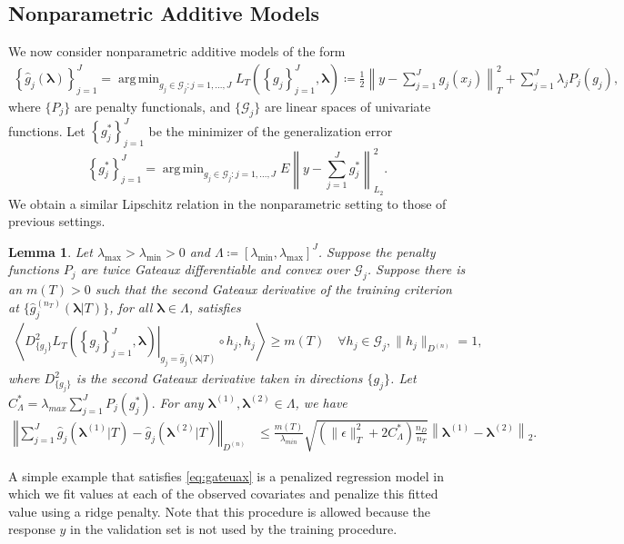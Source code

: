 \documentclass[12pt]{article} %
\newtheorem{lemma}{Lemma}
\theoremstyle{definition}
\DeclareMathOperator*{\argmin}{arg\,min}
\begin{document}
\subsection{Nonparametric Additive Models}
\label{sec:nonparam_smooth}

We now consider nonparametric additive models of the form
\begin{align}
\label{eq:train_crit_nonparam}
\left\{ \hat{g}_j( \boldsymbol \lambda) \right \}_{j=1}^J
=
\argmin_{g_j\in \mathcal{G}_j: j=1,...,J}  L_T\left (\left \{ g_j \right \}_{j=1}^J, \boldsymbol{\lambda} \right )
\coloneqq
\frac{1}{2} \left \| y -  \sum_{j=1}^J g_j(x_j) \right \|^2_T
+ \sum_{j=1}^J \lambda_j P_j(g_j),
\end{align}
where $\{P_j\}$ are penalty functionals, and $\{\mathcal{G}_j\}$ are linear spaces of univariate functions.
Let $\left\{ g_j^* \right \}_{j=1}^J$ be the minimizer of the generalization error
\begin{equation}
\left\{ g_j^* \right \}_{j=1}^J = \argmin_{g_j \in \mathcal{G}_j: j=1,...,J}
E \left \| y - \sum_{j=1}^J g_j^* \right \|^2_{L_2}.
\end{equation}
We obtain a similar Lipschitz relation in the nonparametric setting to those of previous settings.
\begin{lemma}
	\label{lemma:nonparam_smooth}
	Let $\lambda_{\max} > \lambda_{\min} > 0 $ and $\Lambda \coloneqq [\lambda_{\min}, \lambda_{\max}]^J$.
	Suppose the penalty functions $P_{j}$ are twice Gateaux differentiable and convex over $\mathcal{G}_j$.
	Suppose there is an $m(T) > 0$ such that the second Gateaux derivative of the training criterion at $\{\hat{g}^{(n_T)}_j( \boldsymbol{\lambda} | T)\}$, for all $\boldsymbol{\lambda} \in \Lambda$, satisfies
	\begin{align}
	\left \langle
	\left . D^2_{\{g_j\}} L_T \left ( \left \{ g_j \right \}_{j=1}^J, \boldsymbol{\lambda} \right ) \right |_{g_j= \hat{g}_j( \boldsymbol{\lambda} | T) }
	\circ h_j, h_j
	\right \rangle
	\ge m(T)
	\quad \forall h_j \in \mathcal{G}_j,  \|h_j \|_{D^{(n)}} = 1,
	\label{eq:gateuax}
	\end{align}
	where $D^2_{\{g_j\}}$ is the second Gateaux derivative taken in directions $\{g_j\}$.
	Let $
	C_{\Lambda}^*= \lambda_{max}\sum_{j=1}^{J} P_{j}(g^*_j).
	$
	For any $\boldsymbol{\lambda}^{(1)}, \boldsymbol{\lambda}^{(2)} \in \Lambda$, we have
	\begin{align}
	\label{eq:nonparam_lipshitz_thrm}
	\left\Vert
	\sum_{j=1}^J \hat{g}_j\left(\boldsymbol{\lambda}^{(1)} |T \right)-\hat{g}_j\left(\boldsymbol{\lambda}^{(2)} |T \right)\right\Vert _{D^{(n)}} & \le
	\frac{m(T)}{\lambda_{min}}
	\sqrt{
		\left(
		\|\epsilon\|_T^2 + 2 C^*_\Lambda
		\right)
		\frac{n_{D}}{n_{T}}
	}
	\left \|\boldsymbol{\lambda}^{(1)}-\boldsymbol{\lambda}^{(2)} \right \|_2.
	\end{align}
\end{lemma}
\noindent
A simple example that satisfies \eqref{eq:gateuax} is a penalized regression model in which we fit values at each of the observed covariates and penalize this fitted value using a ridge penalty.
Note that this procedure is allowed because the response $y$ in the validation set is not used by the training procedure.
\end{document}
